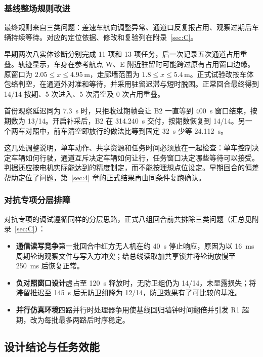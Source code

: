 \subsubsection*{基线整场规则改进}

最终规则来自三类问题：差速车航向调整异常、通道口反复报占用、观察过期后车辆持续等待。对应的定位依据、修改和复验列在附录~\ref{sec:C}。

早期两次八实体诊断分别完成 11 项和 13 项任务，后一次记录五次通道占用重叠。轨迹显示，车身在参考航点 W、E 附近驻留时可能跨过原有占用窗口边缘。原窗口为 $2.05\le x\le4.95\,\mathrm m$，走廊墙范围为 $1.8\le x\le5.4\,\mathrm m$。正式试验改按车体包络判空，在通道外对准和等待，并采用驻留迟滞与短时脱困。正常回合最终得到 14/14 按期、5 次进入、5 次清空及 0 次占用重叠。

首份观察延迟同为 7.3~s 时，只拒收过期帧会让 B2 一直等到 400~s 窗口结束，按期数为 13/14。开启补采后，B2 在 314.240~s 交付，按期数恢复到 14/14。另一个两车对照中，前车清空即放行的做法比等到固定 32~s 少等 24.112~s。

这几处调整说明，单车动作、共享资源和任务时间必须放在一起检查：单车控制决定车辆如何行驶，通道互斥决定车辆如何让行，任务窗口决定哪些等待可以接受。判据还应按电机实际能达到的精度制定，而不能按理想点位设定。早期回合的偏差帮助定位了问题，第~\ref{sec:4} 章的正式结果再由同条件复跑确认。

\subsubsection*{对抗专项分层排障}

对抗专项的调试遵循同样的分层思路，正式八组回合前共排除三类问题（汇总见附录~\ref{sec:C}）：
\begin{itemize}
\item \textbf{通信读写竞争}\quad 第一批回合中红方无人机在约 40~s 停止响应，原因为以 16~ms 周期轮询观察文件与写入方冲突；给总线读取加共享锁并将轮询放慢至 250~ms 后恢复正常。
\item \textbf{负对照窗口设计}\quad 虚占至 120~s 释放时，无防卫组仍为 14/14，未显露损失；将滞留推迟至 145~s 后无防卫组降为 12/14，防卫效果有了可比较的基准。
\item \textbf{并行仿真环境}\quad 四路并行时处理器争用使基线回归墙钟时间翻倍并引发 R1 超期，改为每批最多两路后时序稳定。
\end{itemize}

\subsection{设计结论与任务效能}\label{sec:7.3}

